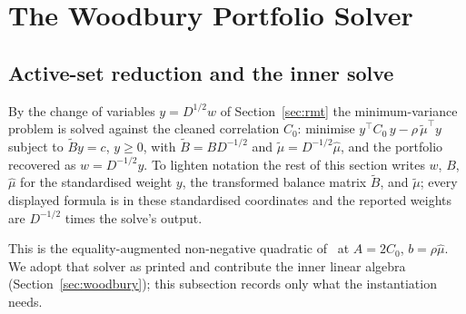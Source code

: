\section{The Woodbury Portfolio Solver}\label{sec:algorithm}

\subsection{Active-set reduction and the inner solve}

By the change of variables $y = D^{1/2} w$ of Section~\ref{sec:rmt} the
minimum-variance problem is solved against the cleaned correlation $C_0$: minimise
$y^\top C_0\, y - \rho\,\tilde\mu^\top y$ subject to $\tilde B y = c$, $y \geq 0$,
with $\tilde B = B D^{-1/2}$ and $\tilde\mu = D^{-1/2}\hat\mu$, and the portfolio
recovered as $w = D^{-1/2} y$. To lighten notation the rest of this section writes
$w$, $B$, $\hat\mu$ for the standardised weight $y$, the transformed balance matrix
$\tilde B$, and $\tilde\mu$; every displayed formula is in these standardised
coordinates and the reported weights are $D^{-1/2}$ times the solve's output.

This is the equality-augmented non-negative quadratic
of~\cite{schmelzer2026nncg} at $A = 2C_0$, $b = \rho\hat\mu$. We adopt that
solver as printed and contribute the inner linear algebra
(Section~\ref{sec:woodbury}); this subsection records only what the
instantiation needs.

